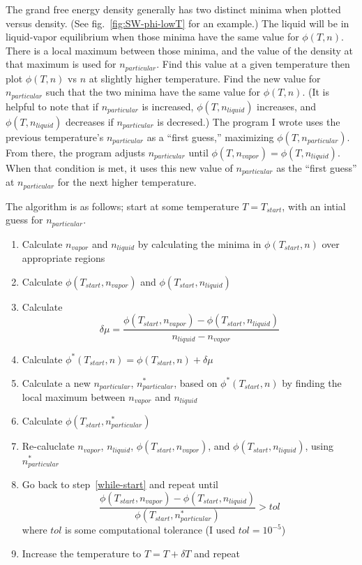 \documentclass[letterpaper,twocolumn,amsmath,amssymb,prb]{revtex4-1}
\newcommand{\npart}{n_{particular}}
\newcommand{\nliq}{n_{liquid}}
\newcommand{\nvap}{n_{vapor}}
\begin{document}
The grand free energy density generally has two distinct minima when
plotted versus density. (See fig.~\ref{fig:SW-phi-lowT} for an example.) The liquid will be in liquid-vapor equilibrium
when those minima have the same value for $\phi(T,n)$. There is a local
maximum between those minima, and the value of the density at that
maximum is used for $\npart$. Find this value at a given temperature
then plot $\phi(T,n)$ vs $n$ at slightly higher temperature. Find the new
value for $\npart$ such that the two minima have the same value for
$\phi(T,n)$. (It is helpful to note that if $\npart$ is increased,
$\phi(T,\nliq)$ increases, and $\phi(T,\nliq)$ decreases if $\npart$ is
decresed.) The program I wrote uses the previous
temperature's $\npart$ as a ``first guess,'' maximizing
$\phi(T,\npart)$. From there, the program adjusts $\npart$
until $\phi(T,\nvap) = \phi(T,\nliq)$. When that condition is met, it
uses this new value of $\npart$ as the ``first guess'' at $\npart$ for the next
higher temperature.

The algorithm is as follows; start at some temperature $T=T_{start}$, with an intial guess for $\npart$.
\begin{enumerate}
  \item Calculate $\nvap$ and $\nliq$ by calculating the minima in $\phi(T_{start},n)$ over appropriate regions
  \item Calculate $\phi(T_{start},\nvap)$ and $\phi(T_{start},\nliq)$ \label{while-start}
  \item Calculate \[\delta\mu = \frac{\phi(T_{start},\nvap) - \phi(T_{start},\nliq)}{\nliq - \nvap}\]
  \item Calculate $\phi^*(T_{start},n) = \phi(T_{start},n) + \delta\mu$
  \item Calculate a new $\npart$, $\npart^*$, based on $\phi^*(T_{start},n)$ by finding the local maximum between $\nvap$ and $\nliq$
  \item Calculate $\phi(T_{start},\npart^*)$
  \item Re-caluclate $\nvap$, $\nliq$, $\phi(T_{start},\nvap)$, and $\phi(T_{start},\nliq)$, using $\npart^*$
  \item Go back to step~\ref{while-start} and repeat until \[ \frac{\phi(T_{start},\nvap) - \phi(T_{start},\nliq)}{\phi(T_{start},\npart^*)} > tol  \] where $tol$ is some computational tolerance (I used $tol=10^{-5}$)
  \item Increase the temperature to $T = T + \delta T$ and repeat
\end{enumerate}
\end{document}
